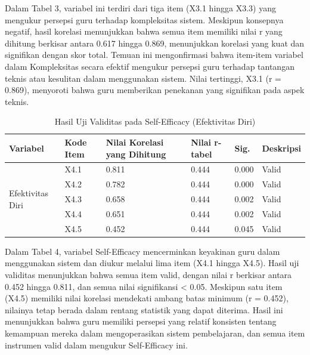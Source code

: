     Dalam Tabel 3, variabel ini terdiri dari tiga item (X3.1 hingga X3.3) yang mengukur persepsi guru terhadap kompleksitas sistem. Meskipun konsepnya negatif, hasil korelasi menunjukkan bahwa semua item memiliki nilai r yang dihitung berkisar antara 0.617 hingga 0.869, menunjukkan korelasi yang kuat dan signifikan dengan skor total. Temuan ini mengonfirmasi bahwa item-item variabel dalam Kompleksitas secara efektif mengukur persepsi guru terhadap tantangan teknis atau kesulitan dalam menggunakan sistem. Nilai tertinggi, X3.1 (r = 0.869), menyoroti bahwa guru memberikan penekanan yang signifikan pada aspek teknis.

    \begin{table}[H]
        \centering
        \caption{Hasil Uji Validitas pada Self-Efficacy (Efektivitas Diri)}
        \label{tab:uji-validitas-self-efficacy}
        \begin{tabularx}{\textwidth}{p{4.5cm}lXXXl}
            \toprule
            \textbf{Variabel} & \textbf{Kode Item} & \textbf{Nilai Korelasi yang Dihitung} & \textbf{Nilai r-tabel} & \textbf{Sig.} & \textbf{Deskripsi} \\
            \midrule
            \multirow{5}{=}{Efektivitas Diri}
                & X4.1 & 0.811 & 0.444 & 0.000 & Valid \\
                & X4.2 & 0.782 & 0.444 & 0.000 & Valid \\
                & X4.3 & 0.658 & 0.444 & 0.002 & Valid \\
                & X4.4 & 0.651 & 0.444 & 0.002 & Valid \\
                & X4.5 & 0.452 & 0.444 & 0.045 & Valid \\
            \bottomrule
        \end{tabularx}
    \end{table}

    Dalam Tabel 4, variabel Self-Efficacy mencerminkan keyakinan guru dalam menggunakan sistem dan diukur melalui lima item (X4.1 hingga X4.5). Hasil uji validitas menunjukkan bahwa semua item valid, dengan nilai r berkisar antara 0.452 hingga 0.811, dan semua nilai signifikansi < 0.05. Meskipun satu item (X4.5) memiliki nilai korelasi mendekati ambang batas minimum (r = 0.452), nilainya tetap berada dalam rentang statistik yang dapat diterima. Hasil ini menunjukkan bahwa guru memiliki persepsi yang relatif konsisten tentang kemampuan mereka dalam mengoperasikan sistem pembelajaran, dan semua item instrumen valid dalam mengukur Self-Efficacy ini.

